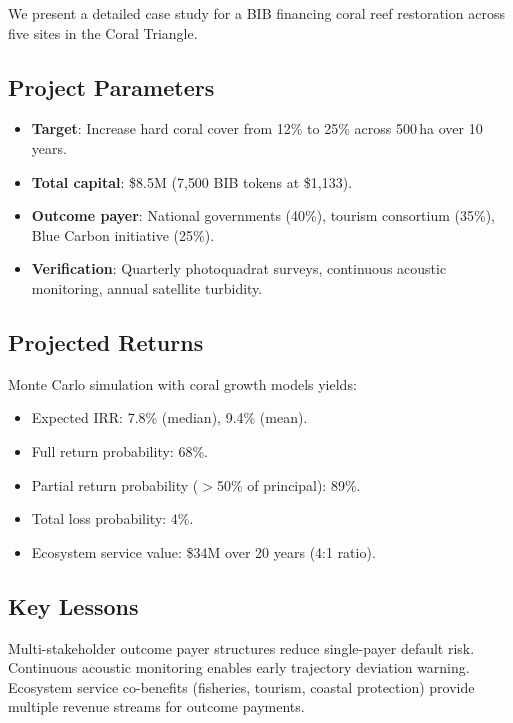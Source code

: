\documentclass[11pt,a4paper]{article}
\begin{document}
We present a detailed case study for a BIB financing coral reef
restoration across five sites in the Coral Triangle.

\subsection{Project Parameters}

\begin{itemize}
  \item \textbf{Target}: Increase hard coral cover from 12\% to 25\%
    across 500\,ha over 10 years.
  \item \textbf{Total capital}: \$8.5M (7{,}500 BIB tokens at \$1{,}133).
  \item \textbf{Outcome payer}: National governments (40\%), tourism
    consortium (35\%), Blue Carbon initiative (25\%).
  \item \textbf{Verification}: Quarterly photoquadrat surveys,
    continuous acoustic monitoring, annual satellite turbidity.
\end{itemize}

\subsection{Projected Returns}

Monte Carlo simulation with coral growth models yields:
\begin{itemize}
  \item Expected IRR: 7.8\% (median), 9.4\% (mean).
  \item Full return probability: 68\%.
  \item Partial return probability ($>$50\% of principal): 89\%.
  \item Total loss probability: 4\%.
  \item Ecosystem service value: \$34M over 20 years (4:1 ratio).
\end{itemize}

\subsection{Key Lessons}

Multi-stakeholder outcome payer structures reduce single-payer default
risk. Continuous acoustic monitoring enables early trajectory deviation
warning. Ecosystem service co-benefits (fisheries, tourism, coastal
protection) provide multiple revenue streams for outcome payments.


\end{document}
